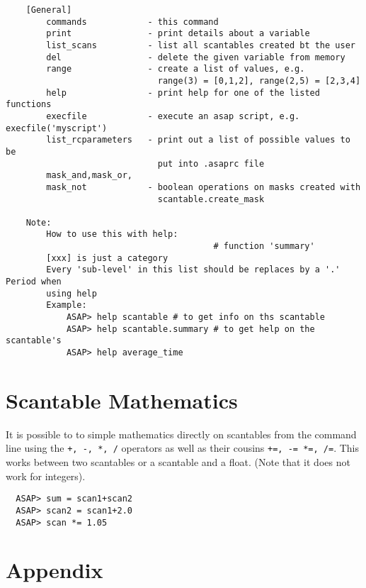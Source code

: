 \documentclass[11pt]{article}
\newcommand{\cmd}[1]{{\tt #1}}
\begin{document}
\begin{verbatim}
    [General]
        commands            - this command
        print               - print details about a variable
        list_scans          - list all scantables created bt the user
        del                 - delete the given variable from memory
        range               - create a list of values, e.g.
                              range(3) = [0,1,2], range(2,5) = [2,3,4]
        help                - print help for one of the listed functions
        execfile            - execute an asap script, e.g. execfile('myscript')
        list_rcparameters   - print out a list of possible values to be
                              put into .asaprc file
        mask_and,mask_or,
        mask_not            - boolean operations on masks created with
                              scantable.create_mask
        
    Note:
        How to use this with help:
                                         # function 'summary'
        [xxx] is just a category
        Every 'sub-level' in this list should be replaces by a '.' Period when
        using help 
        Example:
            ASAP> help scantable # to get info on ths scantable
            ASAP> help scantable.summary # to get help on the scantable's
            ASAP> help average_time

\end{verbatim}

\section{Scantable Mathematics}

It is possible to to simple mathematics directly on scantables from
the command line using the \cmd{+, -, *, /} operators as well as their
cousins \cmd{+=, -= *=, /=}. This works between two scantables or a
scantable and a float. (Note that it does not work for integers).

\begin{verbatim}
  ASAP> sum = scan1+scan2
  ASAP> scan2 = scan1+2.0
  ASAP> scan *= 1.05
\end{verbatim}



\section{Appendix}
\end{document}
